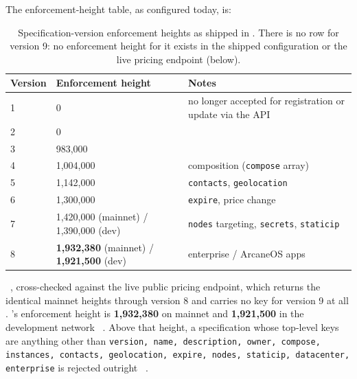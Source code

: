 The enforcement-height table, as configured today, is:

\begin{table}[H]
\centering
\small
\begin{tabular}{@{}llp{6.5cm}@{}}
\toprule
Version & Enforcement height & Notes \\
\midrule
1 & 0 & no longer accepted for registration or update via the API \\
2 & 0 & \\
3 & 983{,}000 & \\
4 & 1{,}004{,}000 & composition (\texttt{compose} array) \\
5 & 1{,}142{,}000 & \texttt{contacts}, \texttt{geolocation} \\
6 & 1{,}300{,}000 & \texttt{expire}, price change \\
7 & 1{,}420{,}000 (mainnet) / 1{,}390{,}000 (dev) & \texttt{nodes} targeting, \texttt{secrets}, \texttt{staticip} \\
8 & \textbf{1{,}932{,}380} (mainnet) / \textbf{1{,}921{,}500} (dev) & enterprise / ArcaneOS apps \\
\bottomrule
\end{tabular}
\caption{Specification-version enforcement heights as shipped in \FluxOS. There is no row for
version 9: no enforcement height for it exists in the shipped configuration or the live pricing
endpoint (below).}
\end{table}

\shipped\ , cross-checked against the live public
pricing endpoint, which returns the identical mainnet heights through version 8 and carries no key
for version 9 at all .
's enforcement height is \textbf{1{,}932{,}380} on mainnet and \textbf{1{,}921{,}500} in the
development network \shipped\ . Above that height, a
specification whose top-level keys are anything other than \texttt{version,\allowbreak{} name,\allowbreak{} description,\allowbreak{}
owner,\allowbreak{} compose,\allowbreak{} instances,\allowbreak{} contacts,\allowbreak{} geolocation,\allowbreak{} expire,\allowbreak{} nodes,\allowbreak{} staticip,\allowbreak{} datacenter,\allowbreak{} enterprise}
is rejected outright \shipped\ .

